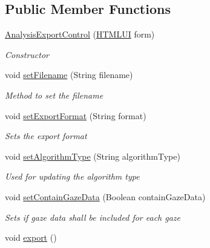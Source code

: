 \subsection*{Public Member Functions}
\begin{DoxyCompactItemize}
\item 
\hyperlink{class_web_analyzer_1_1_u_i_1_1_interaction_objects_1_1_analysis_export_control_a2425c39535e55e12f4ee4975a3176f23}{Analysis\+Export\+Control} (\hyperlink{class_web_analyzer_1_1_u_i_1_1_h_t_m_l_u_i}{H\+T\+M\+L\+U\+I} form)
\begin{DoxyCompactList}\small\item\em Constructor \end{DoxyCompactList}\item 
void \hyperlink{class_web_analyzer_1_1_u_i_1_1_interaction_objects_1_1_analysis_export_control_ab99bfbf3692c2bf98659509acdd35dca}{set\+Filename} (String filename)
\begin{DoxyCompactList}\small\item\em Method to set the filename \end{DoxyCompactList}\item 
void \hyperlink{class_web_analyzer_1_1_u_i_1_1_interaction_objects_1_1_analysis_export_control_a905c7235a4fd676629321fd44716e6a9}{set\+Export\+Format} (String format)
\begin{DoxyCompactList}\small\item\em Sets the export format \end{DoxyCompactList}\item 
void \hyperlink{class_web_analyzer_1_1_u_i_1_1_interaction_objects_1_1_analysis_export_control_a1ddd89e1fa0069f73cc316189d4021dc}{set\+Algorithm\+Type} (String algorithm\+Type)
\begin{DoxyCompactList}\small\item\em Used for updating the algorithm type \end{DoxyCompactList}\item 
void \hyperlink{class_web_analyzer_1_1_u_i_1_1_interaction_objects_1_1_analysis_export_control_a3017c2cba0f0082ffdd7781751f8baf5}{set\+Contain\+Gaze\+Data} (Boolean contain\+Gaze\+Data)
\begin{DoxyCompactList}\small\item\em Sets if gaze data shall be included for each gaze \end{DoxyCompactList}\item 
void \hyperlink{class_web_analyzer_1_1_u_i_1_1_interaction_objects_1_1_analysis_export_control_aefc66bb4dc458b4ed4353eeb0b375275}{export} ()

\end{DoxyCompactItemize}
